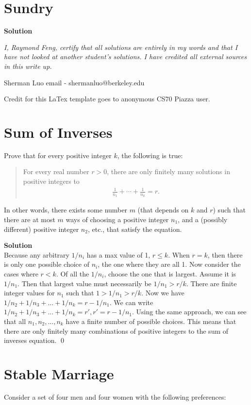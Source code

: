 \documentclass[11pt]{article}
\newcommand*{\Question}[1]{\section{#1}}
\begin{document}
\Question{Sundry} 
\vspace{10pt}
\begin{mdframed} \textbf{Solution} 
\item \textit {I, Raymond Feng, certify that all solutions are entirely in my words and that I have not looked at another student's solutions. I have credited all external sources in this write up.}
\item Sherman Luo email - shermanluo@berkeley.edu
\item Credit for this LaTex template goes to anonymous CS70 Piazza user.
\end{mdframed}
\vfill\pagebreak[3]

\Question{Sum of Inverses}

Prove that for every positive integer $k$, the following is true:\begin{quote}For every real number $r>0$, there are only finitely many solutions in positive integers to
\begin{align*}
\frac{1}{n_1}+\cdots+\frac{1}{n_k}=r.
\end{align*}
\end{quote}In other words, there exists some number $m$ (that depends on $k$ and $r$) such that there are at most $m$ ways of choosing a positive integer $n_1$, and a (possibly different) positive integer $n_2$, etc., that satisfy the equation.

\begin{mdframed} \textbf{Solution} \\
Because any arbitrary $1/n_i$ has a max value of 1, $r \leq k$. When $r=k$, then there is only one possible choice of $n_i$, the one where they are all 1. Now consider the cases where $r<k$. Of all the $1/n_i$, choose the one that is largest. Assume it is $1/n_1$. Then that largest value must necessarily be $1/n_1 > r/k$. There are finite integer values for $n_1$ such that $1 > 1/n_1 > r/k$. Now we have $1/n_2 + 1/n_3 +...+ 1/n_k = r - 1/n_1$. We can write $1/n_2 + 1/n_3 +...+ 1/n_k = r', r' = r - 1/n_1$. Using the same approach, we can see that all $n_1,n_2,...,n_k$ have a finite number of possible choices. This means that there are only finitely many combinations of positive integers to the sum of inverses equation. \qed
\end{mdframed}

\Question{Stable Marriage}

Consider a set of four men and four women with the following preferences:
\end{document}
